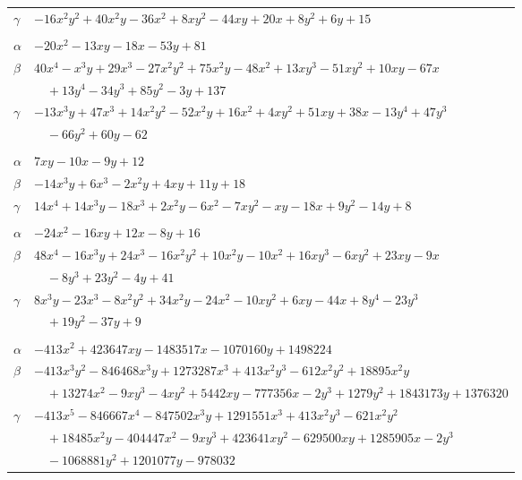 \documentclass[11pt]{article}
\begin{document}
\begin{longtable}{@{}ll@{}}
$\gamma$ & $-16x^{2}y^{2}+40x^{2}y-36x^{2}+8xy^{2}-44xy+20x+8y^{2}+6y+15$\\
\addlinespace[3pt]
\multicolumn{2}{@{}l}{$\{i,j\}=\{6,29\}$, $k_{ij}=2^{3}\cdot 7$}\\
$\alpha$ & $-20x^{2}-13xy-18x-53y+81$\\
$\beta$ & $40x^{4}-x^{3}y+29x^{3}-27x^{2}y^{2}+75x^{2}y-48x^{2}+13xy^{3}-51xy^{2}+10xy-67x$\\
 & $\quad +13y^{4}-34y^{3}+85y^{2}-3y+137$\\
$\gamma$ & $-13x^{3}y+47x^{3}+14x^{2}y^{2}-52x^{2}y+16x^{2}+4xy^{2}+51xy+38x-13y^{4}+47y^{3}$\\
 & $\quad -66y^{2}+60y-62$\\
\addlinespace[3pt]
\multicolumn{2}{@{}l}{$\{i,j\}=\{6,73\}$, $k_{ij}=2\cdot 3$}\\
$\alpha$ & $7xy-10x-9y+12$\\
$\beta$ & $-14x^{3}y+6x^{3}-2x^{2}y+4xy+11y+18$\\
$\gamma$ & $14x^{4}+14x^{3}y-18x^{3}+2x^{2}y-6x^{2}-7xy^{2}-xy-18x+9y^{2}-14y+8$\\
\addlinespace[3pt]
\multicolumn{2}{@{}l}{$\{i,j\}=\{6,80\}$, $k_{ij}=2^{4}$}\\
$\alpha$ & $-24x^{2}-16xy+12x-8y+16$\\
$\beta$ & $48x^{4}-16x^{3}y+24x^{3}-16x^{2}y^{2}+10x^{2}y-10x^{2}+16xy^{3}-6xy^{2}+23xy-9x$\\
 & $\quad -8y^{3}+23y^{2}-4y+41$\\
$\gamma$ & $8x^{3}y-23x^{3}-8x^{2}y^{2}+34x^{2}y-24x^{2}-10xy^{2}+6xy-44x+8y^{4}-23y^{3}$\\
 & $\quad +19y^{2}-37y+9$\\
\addlinespace[3pt]
\multicolumn{2}{@{}l}{$\{i,j\}=\{6,82\}$, $k_{ij}=2^{6}\cdot 3\cdot 7^{3}\cdot 13$}\\
$\alpha$ & $-413x^{2}+423647xy-1483517x-1070160y+1498224$\\
$\beta$ & $-413x^{3}y^{2}-846468x^{3}y+1273287x^{3}+413x^{2}y^{3}-612x^{2}y^{2}+18895x^{2}y$\\
 & $\quad +13274x^{2}-9xy^{3}-4xy^{2}+5442xy-777356x-2y^{3}+1279y^{2}+1843173y+1376320$\\
$\gamma$ & $-413x^{5}-846667x^{4}-847502x^{3}y+1291551x^{3}+413x^{2}y^{3}-621x^{2}y^{2}$\\
 & $\quad +18485x^{2}y-404447x^{2}-9xy^{3}+423641xy^{2}-629500xy+1285905x-2y^{3}$\\
 & $\quad -1068881y^{2}+1201077y-978032$\\

\end{longtable}
\end{document}
